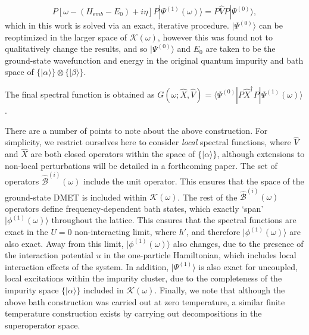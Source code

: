 \documentclass[aps,twocolumn,nobibnotes]{revtex4}
\begin{document}
\begin{inparaenum}
\begin{equation}
    P \left[ \omega - (H_{\mathrm emb}-E_0) + i \eta \right] P | \Psi^{(1)}(\omega) \rangle = P {\hat V} P |\Psi^{(0)} \rangle   ,   \label{eqn:ExactResponse}
\end{equation}
which in this work is solved via an exact, iterative procedure\cite{Langou2005}.
$|\Psi^{(0)} \rangle$ can be reoptimized in the larger space of $\mathcal{K}(\omega)$, however this was found not to qualitatively change the results, and 
so $|\Psi^{(0)}\rangle$ and $E_0$ are taken to be the ground-state wavefunction and energy in the 
original quantum impurity and bath space of $\{ | \alpha \rangle \} \otimes \{ | \beta \rangle \}$.
\item The final spectral function is obtained as $G(\omega; \hat{X}, \hat{V}) = \langle \Psi^{(0)} | P \hat{X}^{\dagger} P | \Psi^{(1)}(\omega) \rangle$.
\end{inparaenum}

There are a number of points to note about the above construction. For simplicity, we restrict ourselves here to consider {\em local} spectral functions, where
${\hat V}$ and ${\hat X}$ are both closed operators within the space of $\{|\alpha \rangle \}$, although extensions to non-local perturbations will be detailed in a forthcoming paper.
The set of operators ${\hat {\mathcal{B}}}^{(i)}(\omega)$ include the unit operator.
This ensures that
the space of the ground-state DMET is included within $\mathcal{K}(\omega)$. The rest of the ${\hat {\mathcal{B}}}^{(i)}(\omega)$ operators define frequency-dependent
bath states, which exactly `span' $|\phi^{(1)}(\omega) \rangle$ throughout the lattice. This ensures that the spectral functions are exact in 
the $U=0$ non-interacting limit, where $h'$, and therefore $|\phi^{(1)}(\omega) \rangle$ are also exact. Away from this limit, 
$|\phi^{(1)}(\omega) \rangle$ also changes, due to the presence of the interaction potential $u$ in the one-particle Hamiltonian, which 
includes local interaction effects of the system.
In addition, $|\Psi^{(1)} \rangle $ is also exact for uncoupled, local excitations within the impurity cluster, due
to the completeness of the impurity space $\{ |\alpha \rangle \}$ included in $\mathcal{K}(\omega)$.
Finally, we note that although the above bath construction was carried out at zero temperature, a similar finite temperature construction exists by carrying 
out decompositions in the superoperator space.
\end{document}
